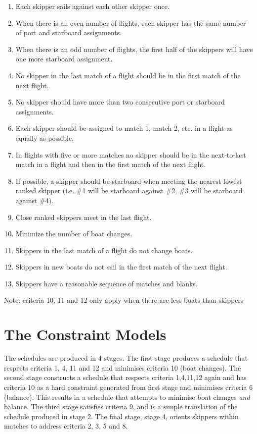 \documentclass{llncs}
\begin{document}
\begin{enumerate}
\item Each skipper sails against each other skipper once.
\item When there is an even number of flights, each skipper has the same number of port and starboard assignments. 
\item When there is an odd number of flights, the first half of the skippers will have one more starboard assignment.
\item No skipper in the last match of a flight should be in the first match of the next flight. 
\item No skipper should have more than two consecutive port or starboard assignments.
\item Each skipper should be assigned to match 1, match 2, etc. in a flight as equally as possible.
\item In flights with five or more matches no skipper should be in the next-to-last match in a flight and then in the first match of the next flight.
\item If possible, a skipper should be starboard when meeting the nearest lowest ranked skipper (i.e. \#1 will be starboard against \#2, \#3 will be starboard against \#4).
\item Close ranked skippers meet in the last flight.
\item Minimize the number of boat changes.
\item Skippers in the last match of a flight do not change boats.
\item Skippers in new boats do not sail in the first match of the next flight.
\item Skippers have a reasonable sequence of matches and blanks.
\end{enumerate}

\noindent
Note: criteria 10, 11 and 12 only apply when there are less boats than skippers

\section{The Constraint Models}
The schedules are produced in 4 stages. The first stage produces a schedule that respects criteria 1, 4, 11 and 12 and minimises criteria 10 (boat changes). The second stage constructs a schedule that respects criteria 1,4,11,12 again and has criteria 10 as a hard constraint generated from first stage and minimises criteria 6 (balance). This results in a schedule that attempts to minimise boat changes \emph{and} balance. The third stage satisfies criteria 9, and is a simple translation of the schedule produced in stage 2.  The final stage, stage 4, orients skippers within matches to address criteria 2, 3, 5 and 8. 
\end{document}
